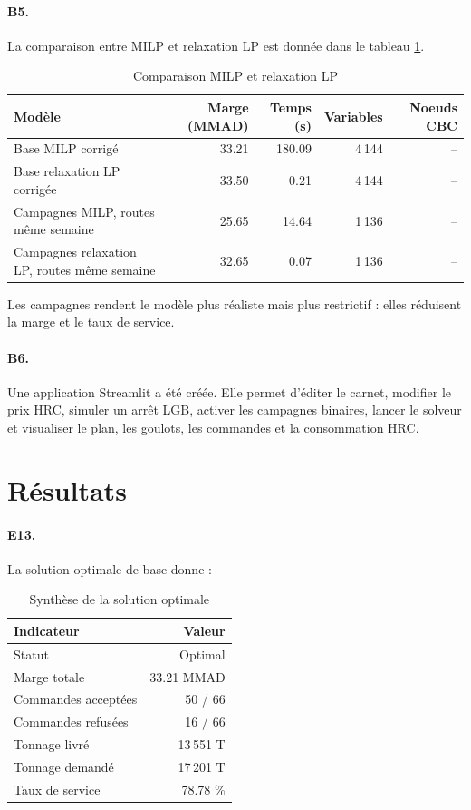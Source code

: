 \documentclass[12pt,a4paper]{article}
\newcommand{\question}[1]{\paragraph{\textcolor{blue!50!black}{#1.}}}
\newcommand{\sectiontarget}[1]{}
\begin{document}
\begin{center}
\end{center}

\question{B5}
La comparaison entre MILP et relaxation LP est donnée dans le tableau \ref{tab:bb}.

\begin{table}[H]
\centering
\caption{Comparaison MILP et relaxation LP}
\label{tab:bb}
\begin{tabular}{lrrrr}
\toprule
Modèle & Marge (MMAD) & Temps (s) & Variables & Noeuds CBC \\
\midrule
Base MILP corrigé & 33.21 & 180.09 & 4\,144 & -- \\
Base relaxation LP corrigée & 33.50 & 0.21 & 4\,144 & -- \\
Campagnes MILP, routes même semaine & 25.65 & 14.64 & 1\,136 & -- \\
Campagnes relaxation LP, routes même semaine & 32.65 & 0.07 & 1\,136 & -- \\
\bottomrule
\end{tabular}
\end{table}

Les campagnes rendent le modèle plus réaliste mais plus restrictif : elles réduisent la marge et le taux de service.

\question{B6}
Une application Streamlit a été créée. Elle permet d'éditer le carnet, modifier le prix HRC, simuler un arrêt LGB, activer les campagnes binaires, lancer le solveur et visualiser le plan, les goulots, les commandes et la consommation HRC.

\clearpage
\section{Résultats}
\sectiontarget{3 a 5 pages}

\question{E13}
La solution optimale de base donne :

\begin{table}[H]
\centering
\caption{Synthèse de la solution optimale}
\begin{tabular}{lr}
\toprule
Indicateur & Valeur \\
\midrule
Statut & Optimal \\
Marge totale & 33.21 MMAD \\
Commandes acceptées & 50 / 66 \\
Commandes refusées & 16 / 66 \\
Tonnage livré & 13\,551 T \\
Tonnage demandé & 17\,201 T \\
Taux de service & 78.78 \% \\
\bottomrule
\end{tabular}
\end{table}
\end{document}
